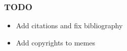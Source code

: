 \documentclass[c,10pt,pdftex]{beamer}
\begin{document}
\begin{frame}
\begin{columns}
\begin{column}{0.5\linewidth}
\begin{figure}
	\end{figure}
\end{column}
\end{columns}
\end{frame}

\begin{frame}
\frametitle{TODO}
\begin{itemize}
	\item Add citations and fix bibliography
	\item Add copyrights to memes
\end{itemize}
\end{frame}
\end{document}
